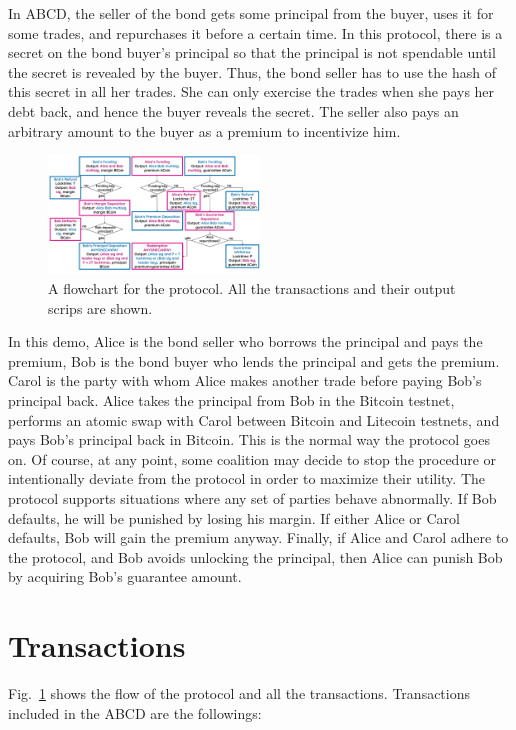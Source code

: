 \documentclass[conference,compsoc]{IEEEtran}
\begin{document}
In ABCD, the seller of the bond gets some principal from the buyer, uses it for some trades, and repurchases it before a certain time. In this protocol, there is a secret on the bond buyer's principal so that the principal is not spendable until the secret is revealed by the buyer. Thus, the bond seller has to use the hash of this secret in all her trades. She can only exercise the trades when she pays her debt back, and hence the buyer reveals the secret. The seller also pays an arbitrary amount to the buyer as a premium to incentivize him.
\begin{figure}
    \centering
    \includegraphics[width=0.5\textwidth]{ABCDfateme.pdf}
    \caption{ A flowchart for the protocol. All the transactions and their output scrips are shown. }
    \label{fig:flowchart}
\end{figure}
In this demo, Alice is the bond seller who borrows the principal and pays the premium, Bob is the bond buyer who lends the principal and gets the premium. Carol is the party with whom Alice makes another trade before paying Bob's principal back. Alice takes the principal from Bob in the Bitcoin testnet, performs an atomic swap with Carol between Bitcoin and Litecoin testnets, and pays Bob's principal back in Bitcoin. This is the normal way the protocol goes on. Of course, at any point, some coalition may decide to stop the procedure or intentionally deviate from the protocol in order to maximize their utility. The protocol supports situations where any set of parties behave abnormally. If Bob defaults, he will be punished by losing his margin. If either Alice or Carol defaults, Bob will gain the premium anyway. Finally, if Alice and Carol adhere to the protocol, and Bob avoids unlocking the principal, then Alice can punish Bob by acquiring Bob's guarantee amount. 


 
\section{Transactions}
Fig.~\ref{fig:flowchart} shows the flow of the protocol and all the transactions. Transactions included in the ABCD are the followings:
\end{document}
